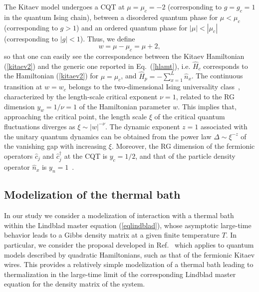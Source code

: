 The Kitaev model undergoes a CQT at $\mu=\mu_c = -2$ (corresponding to
$g=g_c=1$ in the quantum Ising chain), between a disordered quantum
phase for $\mu<\mu_c$ (corresponding to $g>1$) and an ordered quantum
phase for $|\mu|<|\mu_c|$ (corresponding to $|g|<1$). Thus, we define
\begin{equation}
  w = \mu - \mu_c = \mu + 2,
  \label{wdef}
\end{equation}
so that one can easily see the correspondence between the Kitaev
Hamiltonian (\ref{kitaev2}) and the generic one reported in
Eq.~(\ref{hlamt}), i.e. $\hat{H}_c$ corresponds to the Hamiltonian
(\ref{kitaev2}) for $\mu=\mu_c$, and $\hat{H}_p=-\sum_{x=1}^L \hat
n_x$.  The continuous transition at $w=w_c$ belongs to the
two-dimensional Ising universality class~\cite{S99,rossini2021coherent},
characterized by the length-scale critical exponent $\nu=1$, related
to the RG dimension $y_w = 1/\nu=1$ of the Hamiltonian parameter
$w$. This implies that, approaching the critical point, the length
scale $\xi$ of the critical quantum fluctuations diverges as $\xi \sim
|w|^{-\nu}$. The dynamic exponent $z=1$ associated with the unitary
quantum dynamics can be obtained from the power law
$\Delta\sim\xi^{-z}$ of the vanishing gap with increasing $\xi$.
Moreover, the RG dimension of the fermionic operators $\hat c_j$ and
$\hat c^\dagger_j$ at the CQT is $y_c = 1/2$, and that of the particle
density operator $\hat n_x$ is $y_n = 1$~\cite{S99,rossini2021coherent}.


\subsection{Modelization of the thermal bath}
\label{thebath}

In our study we consider a modelization of interaction with a thermal
bath within the Lindblad master equation (\ref{eqlindblad}), whose
asymptotic large-time behavior leads to a Gibbs density matrix at a
given finite temperature $T$. In particular, we consider the proposal
developed in Ref.~\cite{dr2021self} which applies to quantum models
described by quadratic Hamiltonians, such as that of the fermionic
Kitaev wires. This provides a relatively simple modelization of a
thermal bath leading to thermalization in the large-time limit of the
corresponding Lindblad master equation for the density matrix of the
system.

